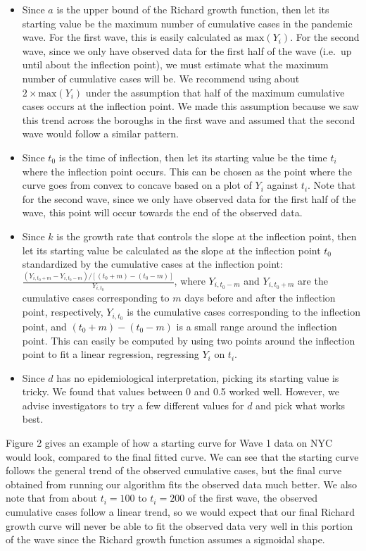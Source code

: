 \documentclass[
]{article}
\begin{document}
\begin{itemize}
\item
  Since \(a\) is the upper bound of the Richard growth function, then
  let its starting value be the maximum number of cumulative cases in
  the pandemic wave. For the first wave, this is easily calculated as
  \(\mbox{max}(Y_i)\). For the second wave, since we only have observed
  data for the first half of the wave (i.e.~up until about the
  inflection point), we must estimate what the maximum number of
  cumulative cases will be. We recommend using about
  \(2 \times \mbox{max}(Y_i)\) under the assumption that half of the
  maximum cumulative cases occurs at the inflection point. We made this
  assumption because we saw this trend across the boroughs in the first
  wave and assumed that the second wave would follow a similar pattern.
\item
  Since \(t_0\) is the time of inflection, then let its starting value
  be the time \(t_i\) where the inflection point occurs. This can be
  chosen as the point where the curve goes from convex to concave based
  on a plot of \(Y_i\) against \(t_i\). Note that for the second wave,
  since we only have observed data for the first half of the wave, this
  point will occur towards the end of the observed data.
\item
  Since \(k\) is the growth rate that controls the slope at the
  inflection point, then let its starting value be calculated as the
  slope at the inflection point \(t_0\) standardized by the cumulative
  cases at the inflection point:
  \(\frac{(Y_{i,t_0 + m} - Y_{i,t_0 - m})/[(t_0 + m) - (t_0 - m)]}{Y_{i,t_0}}\),
  where \(Y_{i,t_0 - m}\) and \(Y_{i,t_0 + m}\) are the cumulative cases
  corresponding to \(m\) days before and after the inflection point,
  respectively, \(Y_{i,t_0}\) is the cumulative cases corresponding to
  the inflection point, and \((t_0 + m) - (t_0 - m)\) is a small range
  around the inflection point. This can easily be computed by using two
  points around the inflection point to fit a linear regression,
  regressing \(Y_i\) on \(t_i\).
\item
  Since \(d\) has no epidemiological interpretation, picking its
  starting value is tricky. We found that values between 0 and 0.5
  worked well. However, we advise investigators to try a few different
  values for \(d\) and pick what works best.
\end{itemize}

Figure 2 gives an example of how a starting curve for Wave 1 data on NYC
would look, compared to the final fitted curve. We can see that the
starting curve follows the general trend of the observed cumulative
cases, but the final curve obtained from running our algorithm fits the
observed data much better. We also note that from about \(t_i = 100\) to
\(t_i = 200\) of the first wave, the observed cumulative cases follow a
linear trend, so we would expect that our final Richard growth curve
will never be able to fit the observed data very well in this portion of
the wave since the Richard growth function assumes a sigmoidal shape.
\end{document}
